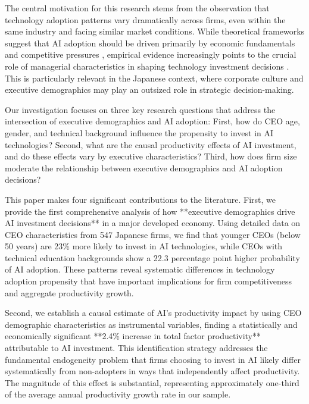 \documentclass[12pt, a4paper]{article}
\begin{document}
The central motivation for this research stems from the observation that technology adoption patterns vary dramatically across firms, even within the same industry and facing similar market conditions. While theoretical frameworks suggest that AI adoption should be driven primarily by economic fundamentals and competitive pressures \citep{brynjolfsson2019artificial, agrawal2018prediction}, empirical evidence increasingly points to the crucial role of managerial characteristics in shaping technology investment decisions \citep{hambrick2007upper}. This is particularly relevant in the Japanese context, where corporate culture and executive demographics may play an outsized role in strategic decision-making.

Our investigation focuses on three key research questions that address the intersection of executive demographics and AI adoption: First, how do CEO age, gender, and technical background influence the propensity to invest in AI technologies? Second, what are the causal productivity effects of AI investment, and do these effects vary by executive characteristics? Third, how does firm size moderate the relationship between executive demographics and AI adoption decisions?

This paper makes four significant contributions to the literature. First, we provide the first comprehensive analysis of how **executive demographics drive AI investment decisions** in a major developed economy. Using detailed data on CEO characteristics from 547 Japanese firms, we find that younger CEOs (below 50 years) are 23\% more likely to invest in AI technologies, while CEOs with technical education backgrounds show a 22.3 percentage point higher probability of AI adoption. These patterns reveal systematic differences in technology adoption propensity that have important implications for firm competitiveness and aggregate productivity growth.

Second, we establish a causal estimate of AI's productivity impact by using CEO demographic characteristics as instrumental variables, finding a statistically and economically significant **2.4\% increase in total factor productivity** attributable to AI investment. This identification strategy addresses the fundamental endogeneity problem that firms choosing to invest in AI likely differ systematically from non-adopters in ways that independently affect productivity. The magnitude of this effect is substantial, representing approximately one-third of the average annual productivity growth rate in our sample.
\end{document}
